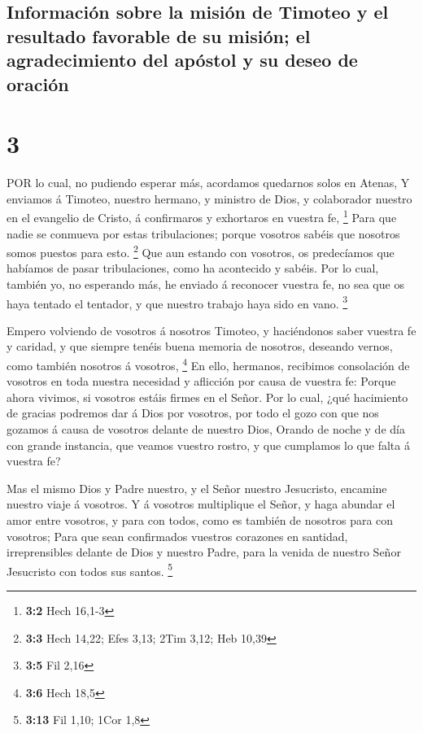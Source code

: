 \hypertarget{informaciuxf3n-sobre-la-misiuxf3n-de-timoteo-y-el-resultado-favorable-de-su-misiuxf3n-el-agradecimiento-del-apuxf3stol-y-su-deseo-de-oraciuxf3n}{%
\subsection{Información sobre la misión de Timoteo y el resultado
favorable de su misión; el agradecimiento del apóstol y su deseo de
oración}\label{informaciuxf3n-sobre-la-misiuxf3n-de-timoteo-y-el-resultado-favorable-de-su-misiuxf3n-el-agradecimiento-del-apuxf3stol-y-su-deseo-de-oraciuxf3n}}

\hypertarget{section-2}{%
\section{3}\label{section-2}}

 POR lo cual, no pudiendo esperar más, acordamos quedarnos
solos en Atenas,  Y enviamos á Timoteo, nuestro hermano, y
ministro de Dios, y colaborador nuestro en el evangelio de Cristo, á
confirmaros y exhortaros en vuestra fe, \footnote{\textbf{3:2} Hech
  16,1-3}  Para que nadie se conmueva por estas
tribulaciones; porque vosotros sabéis que nosotros somos puestos para
esto. \footnote{\textbf{3:3} Hech 14,22; Efes 3,13; 2Tim 3,12; Heb 10,39}
 Que aun estando con vosotros, os predecíamos que habíamos
de pasar tribulaciones, como ha acontecido y sabéis.  Por lo
cual, también yo, no esperando más, he enviado á reconocer vuestra fe,
no sea que os haya tentado el tentador, y que nuestro trabajo haya sido
en vano. \footnote{\textbf{3:5} Fil 2,16}

 Empero volviendo de vosotros á nosotros Timoteo, y
haciéndonos saber vuestra fe y caridad, y que siempre tenéis buena
memoria de nosotros, deseando vernos, como también nosotros á vosotros,
\footnote{\textbf{3:6} Hech 18,5}  En ello, hermanos,
recibimos consolación de vosotros en toda nuestra necesidad y aflicción
por causa de vuestra fe:  Porque ahora vivimos, si vosotros
estáis firmes en el Señor.  Por lo cual, ¿qué hacimiento de
gracias podremos dar á Dios por vosotros, por todo el gozo con que nos
gozamos á causa de vosotros delante de nuestro Dios, 
Orando de noche y de día con grande instancia, que veamos vuestro
rostro, y que cumplamos lo que falta á vuestra fe?

 Mas el mismo Dios y Padre nuestro, y el Señor nuestro
Jesucristo, encamine nuestro viaje á vosotros.  Y á
vosotros multiplique el Señor, y haga abundar el amor entre vosotros, y
para con todos, como es también de nosotros para con vosotros;
 Para que sean confirmados vuestros corazones en santidad,
irreprensibles delante de Dios y nuestro Padre, para la venida de
nuestro Señor Jesucristo con todos sus santos. \footnote{\textbf{3:13}
  Fil 1,10; 1Cor 1,8}

